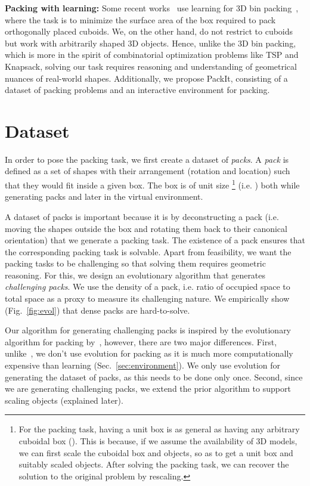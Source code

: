 \documentclass{article}
\begin{document}
\noindent \textbf{Packing with learning:} Some recent works~\cite{hu2017solving,laterre2018ranked} use learning for 3D bin packing~\cite{martello2000three}, where the task is to minimize the surface area of the box required to pack orthogonally placed cuboids. We, on the other hand, do not restrict to cuboids but work with arbitrarily shaped 3D objects. Hence, unlike the 3D bin packing, which is more in the spirit of combinatorial optimization problems like TSP and Knapsack, solving our task requires reasoning and understanding of geometrical nuances of real-world shapes. Additionally, we propose PackIt, consisting of a dataset of packing problems and an interactive environment for packing.

\section{Dataset}
\label{sec:dataset}
In order to pose the packing task, we first create a dataset of \textit{packs}. A \textit{pack} is defined as a set of shapes with their arrangement (rotation and location) such that they would fit inside a given box. The box is of unit size \footnote{ \label{box} For the packing task, having a unit box is as general as having any arbitrary cuboidal box (). This is because, if we assume the availability of 3D models, we can first scale the cuboidal box and objects, so as to get a unit box and suitably scaled objects. After solving the packing task, we can recover the solution to the original problem by rescaling.} (i.e. ) both while generating packs and later in the virtual environment.

A dataset of packs is important because it is by deconstructing a pack (i.e. moving the shapes outside the box and rotating them back to their canonical orientation) that we generate a packing task. The existence of a pack ensures that the corresponding packing task is solvable. Apart from feasibility, we want the packing tasks to be challenging so that solving them requires geometric reasoning. For this, we design an evolutionary algorithm that generates \textit{challenging packs}. We use the density of a pack, i.e. ratio of occupied space to total space as a proxy to measure its challenging nature. We empirically show (Fig.~\ref{fig:evol}) that dense packs are hard-to-solve.

Our algorithm for generating challenging packs is inspired by the evolutionary algorithm for packing by~\citet{tiwari2010fast}, however, there are two major differences.  First, unlike~\cite{tiwari2010fast}, we don't use evolution for packing as it is much more computationally expensive than learning (Sec.~\ref{sec:environment}). We only use evolution for generating the dataset of packs, as this needs to be done only once. Second, since we are generating challenging packs, we extend the prior algorithm to support scaling objects (explained later).
\end{document}
